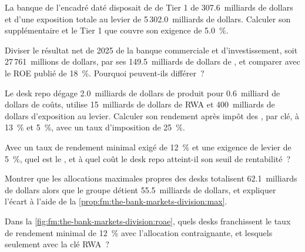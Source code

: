 \begin{exercise}[$\star$]\label{exo:fm:the-bank-markets-division:1}
La banque de l'encadré daté disposait de  de Tier 1 de 307.6~milliards de dollars et d'une exposition totale au levier de 5\,302.0~milliards de dollars. Calculer son  supplémentaire et le Tier 1 que couvre son exigence de 5.0~\%.
\end{exercise}

\begin{exercise}[$\star$]\label{exo:fm:the-bank-markets-division:2}
Diviser le résultat net de 2025 de la banque commerciale et d'investissement, soit 27\,761~millions de dollars, par ses 149.5~milliards de dollars de , et comparer avec le
ROE publié de 18~\%. Pourquoi peuvent-ils différer~?
\end{exercise}

\begin{exercise}[$\star$]\label{exo:fm:the-bank-markets-division:3}
Le desk repo dégage 2.0~milliards de dollars de produit pour 0.6~milliard de dollars de coûts, utilise 15~milliards de dollars de RWA et 400~milliards de dollars d'exposition au levier. Calculer son
rendement après impôt des , par clé, à 13~\% et 5~\%, avec un taux d'imposition de 25~\%.
\end{exercise}

\begin{exercise}[$\star\star$]\label{exo:fm:the-bank-markets-division:4}
Avec un taux de rendement minimal exigé de 12~\% et une exigence de levier de 5~\%, quel est le , et à quel coût le desk repo atteint-il son seuil de rentabilité~?
\end{exercise}

\begin{exercise}[$\star\star$]\label{exo:fm:the-bank-markets-division:5}
Montrer que les allocations maximales propres des desks totalisent 62.1~milliards de dollars alors que le groupe détient 55.5~milliards de dollars, et expliquer l'écart à l'aide de la
\cref{prop:fm:the-bank-markets-division:max}.
\end{exercise}

\begin{exercise}[$\star\star$]\label{exo:fm:the-bank-markets-division:6}
Dans la \cref{fig:fm:the-bank-markets-division:roae}, quels desks franchissent le taux de rendement minimal de 12~\% avec l'allocation contraignante, et lesquels seulement avec la clé RWA~?
\end{exercise}

